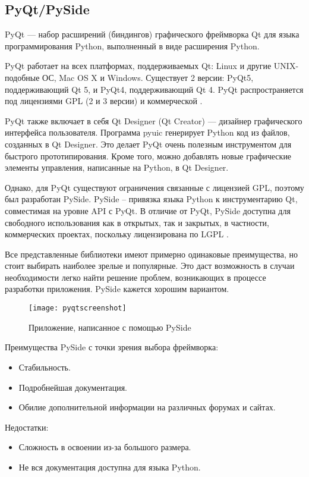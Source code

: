 \documentclass[14pt]{extreport}
\begin{document}
\subsection{PyQt/PySide}
PyQt — набор расширений (биндингов) графического фреймворка Qt для языка программирования Python, выполненный в виде расширения Python.

PyQt работает на всех платформах, поддерживаемых Qt: Linux и другие UNIX-подобные ОС, Mac OS X и Windows. Существует 2 версии: PyQt5, поддерживающий Qt 5, и PyQt4, поддерживающий Qt 4. PyQt распространяется под лицензиями GPL (2 и 3 версии) и коммерческой \cite{pyqt}. 

PyQt также включает в себя Qt Designer (Qt Creator) — дизайнер графического интерфейса пользователя. Программа pyuic генерирует Python код из файлов, созданных в Qt Designer. Это делает PyQt очень полезным инструментом для быстрого прототипирования. Кроме того, можно добавлять новые графические элементы управления, написанные на Python, в Qt Designer. 

Однако, для PyQt существуют ограничения связанные с лицензией GPL, поэтому был разработан PySide. PySide -- привязка языка Python к инструментарию Qt, совместимая на уровне API с PyQt. В отличие от PyQt, PySide доступна для свободного использования как в открытых, так и закрытых, в частности, коммерческих проектах, поскольку лицензирована по LGPL \cite{pyside}. 

Все представленные библиотеки имеют примерно одинаковые преимущества, но стоит выбирать наиболее зрелые и популярные. Это даст возможность в случаи необходимости легко найти решение проблем, возникающих в процессе разработки приложения. PySide кажется хорошим вариантом.

\begin{figure}[H]
	\centerline{\texttt{[image: pyqtscreenshot]}}
	\caption{Приложение, написанное с помощью PySide}
	\label{fig14}
\end{figure}

Преимущества PySide с точки зрения выбора фреймворка:
\begin{itemize}
	\item Стабильность.
	\item Подробнейшая документация.
	\item Обилие дополнительной информации на различных форумах и сайтах.
\end{itemize}

Недостатки:
\begin{itemize}
	\item Сложность в освоении из-за большого размера.
	\item Не вся документация доступна для языка Python.
\end{itemize}
\end{document}
